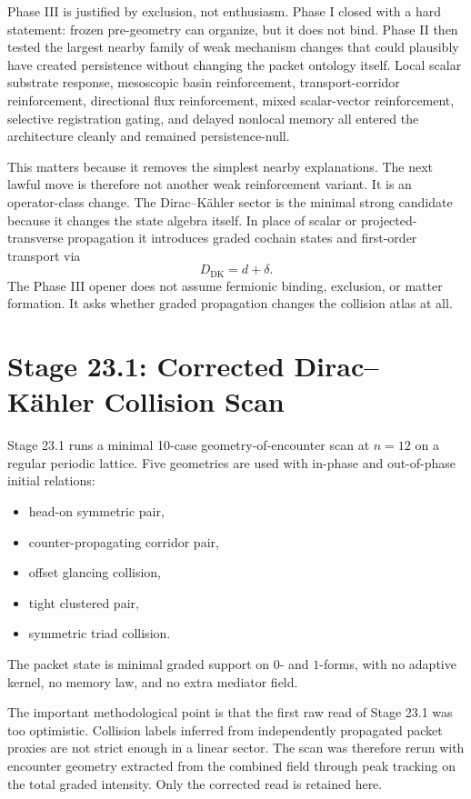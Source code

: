 \documentclass[11pt]{article}
\begin{document}
Phase III is justified by exclusion, not enthusiasm. Phase I closed with a hard statement: frozen pre-geometry can organize, but it does not bind. Phase II then tested the largest nearby family of weak mechanism changes that could plausibly have created persistence without changing the packet ontology itself. Local scalar substrate response, mesoscopic basin reinforcement, transport-corridor reinforcement, directional flux reinforcement, mixed scalar-vector reinforcement, selective registration gating, and delayed nonlocal memory all entered the architecture cleanly and remained persistence-null.

This matters because it removes the simplest nearby explanations. The next lawful move is therefore not another weak reinforcement variant. It is an operator-class change. The Dirac--K\"ahler sector is the minimal strong candidate because it changes the state algebra itself. In place of scalar or projected-transverse propagation it introduces graded cochain states and first-order transport via
\[
D_{\mathrm{DK}} = d + \delta.
\]
The Phase III opener does not assume fermionic binding, exclusion, or matter formation. It asks whether graded propagation changes the collision atlas at all.

\section{Stage 23.1: Corrected Dirac--K\"ahler Collision Scan}

Stage 23.1 runs a minimal 10-case geometry-of-encounter scan at $n=12$ on a regular periodic lattice. Five geometries are used with in-phase and out-of-phase initial relations:
\begin{itemize}
\item head-on symmetric pair,
\item counter-propagating corridor pair,
\item offset glancing collision,
\item tight clustered pair,
\item symmetric triad collision.
\end{itemize}
The packet state is minimal graded support on $0$- and $1$-forms, with no adaptive kernel, no memory law, and no extra mediator field.

The important methodological point is that the first raw read of Stage 23.1 was too optimistic. Collision labels inferred from independently propagated packet proxies are not strict enough in a linear sector. The scan was therefore rerun with encounter geometry extracted from the combined field through peak tracking on the total graded intensity. Only the corrected read is retained here.
\end{document}
